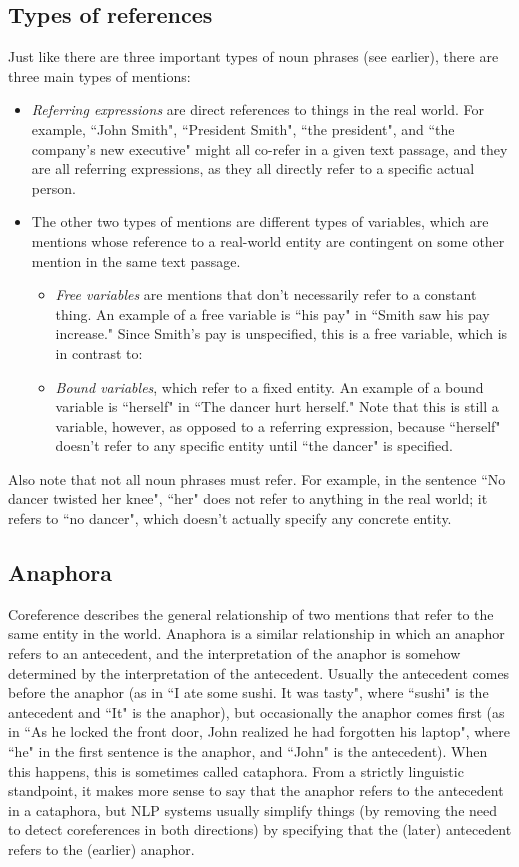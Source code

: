 \subsection{Types of references}
Just like there are three important types of noun phrases (see earlier), there are three main types of mentions:
\begin{itemize}
\item \emph{Referring expressions} are direct references to things in the real world. For example, ``John Smith", ``President Smith", ``the president", and ``the company's new executive" might all co-refer in a given text passage, and they are all referring expressions, as they all directly refer to a specific actual person.
\item The other two types of mentions are different types of variables, which are mentions whose reference to a real-world entity are contingent on some other mention in the same text passage.
\begin{itemize}
\item \emph{Free variables} are mentions that don't necessarily refer to a constant thing. An example of a free variable is ``his pay" in ``Smith saw his pay increase." Since Smith's pay is unspecified, this is a free variable, which is in contrast to:
\item \emph{Bound variables}, which refer to a fixed entity. An example of a bound variable is ``herself" in ``The dancer hurt herself." Note that this is still a variable, however, as opposed to a referring expression, because ``herself" doesn't refer to any specific entity until ``the dancer" is specified.
\end{itemize}
\end{itemize}
Also note that not all noun phrases must refer. For example, in the sentence ``No dancer twisted her knee", ``her" does not refer to anything in the real world; it refers to ``no dancer", which doesn't actually specify any concrete entity.

\subsection{Anaphora}
Coreference describes the general relationship of two mentions that refer to the same entity in the world. Anaphora is a similar relationship in which an anaphor refers to an antecedent, and the interpretation of the anaphor is somehow determined by the interpretation of the antecedent. Usually the antecedent comes before the anaphor (as in ``I ate some sushi. It was tasty", where ``sushi" is the antecedent and ``It" is the anaphor), but occasionally the anaphor comes first (as in ``As he locked the front door, John realized he had forgotten his laptop", where ``he" in the first sentence is the anaphor, and ``John" is the antecedent). When this happens, this is sometimes called cataphora. From a strictly linguistic standpoint, it makes more sense to say that the anaphor refers to the antecedent in a cataphora, but NLP systems usually simplify things (by removing the need to detect coreferences in both directions) by specifying that the (later) antecedent refers to the (earlier) anaphor.

